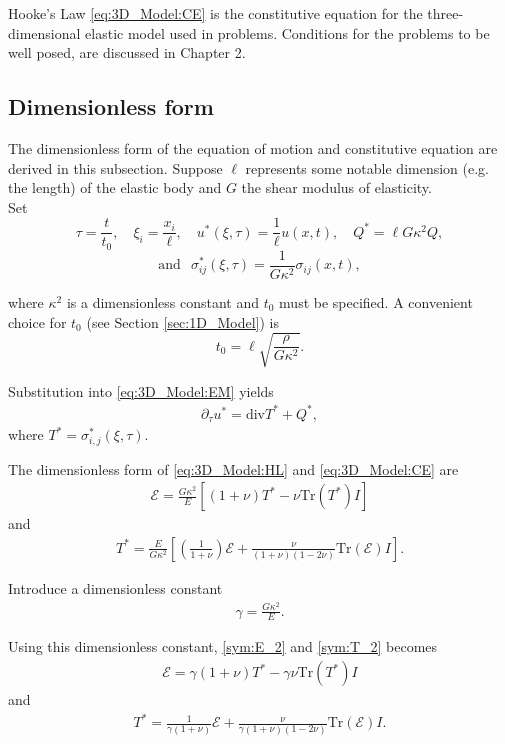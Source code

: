 \documentclass[../../main.tex]{subfiles}ite{VS18}
\begin{document}
Hooke's Law \eqref{eq:3D_Model:CE} is the constitutive equation for the
three-dimensional elastic model used in problems. Conditions for the problems
to be well posed, are discussed in Chapter 2.

\subsection{Dimensionless form} \label{ssec:3D_Model:DimensionlessForm}
The dimensionless form of the equation of motion and constitutive equation are
derived in this subsection. Suppose $\ell$ represents some notable dimension
(e.g. the length) of the elastic body and $G$ the shear modulus of elasticity.\\

Set \[\tau = \frac{t}{t_0},\quad \xi_i = \frac{x_i}{\ell},\quad {u}^*(\xi,\tau) = \frac{1}{\ell}{u}(x,t), \quad Q^{*} = \ell G \kappa^2 Q, \]
\[ \text{and} \ \,\,\, \sigma_{ij}^*(\xi,\tau) = \frac{1}{G\kappa^2}\sigma_{ij}(x,t),\]\label{sym:t}\label{sym:G}\label{sym:tau}\label{sym:xi}\label{sym:Qstar}\label{sym:sigmaijstar}\label{sym:ell}\label{sym:kappa2}

where $\kappa^2$ is a dimensionless constant and $t_0$ must be specified. A
convenient choice for $t_0$ (see Section \ref{sec:1D_Model}) is \[t_0 = \ell\sqrt{\frac{\rho}{G\kappa^2}}.\]

Substitution into \eqref{eq:3D_Model:EM} yields
\begin{eqnarray*}
	\partial_{\tau} u^{*} = \textrm{div}T^* + Q^*,
\end{eqnarray*}
where $T^* = \sigma_{i,j}^*(\xi,\tau)$.

The dimensionless form of \eqref{eq:3D_Model:HL} and \eqref{eq:3D_Model:CE} are
\begin{eqnarray}
	\mathcal{E} = \frac{G \kappa^2}{E} \left[ (1+\nu)T^* - \nu \textrm{Tr}(T^*)I \right] \label{sym:E_2}
\end{eqnarray}\label{sym:I}
and
\begin{eqnarray}
	T^* = \frac{E}{G \kappa^2} \left[\left( \frac{1}{1+\nu} \right)\mathcal{E} + \frac{\nu}{(1+\nu)(1-2\nu)}\textrm{Tr}(\mathcal{E})I \right]. \label{sym:T_2}
\end{eqnarray}

Introduce a dimensionless constant
\begin{eqnarray*}
	\gamma= \frac{G\kappa^2}{E}.
\end{eqnarray*}\label{sym:gamma}

Using this dimensionless constant, \eqref{sym:E_2} and \eqref{sym:T_2} becomes
\begin{eqnarray}
	\mathcal{E} = \gamma(1+\nu)T^* - \gamma\nu \textrm{Tr}(T^*)I \label{DM_H_E}
\end{eqnarray}
and
\begin{eqnarray}
	T^* = \frac{1}{\gamma(1+\nu)}\mathcal{E} + \frac{\nu}{\gamma(1+\nu)(1-2\nu)}\textrm{Tr}(\mathcal{E})I. \label{DM_H_T}
\end{eqnarray}
\end{document}
